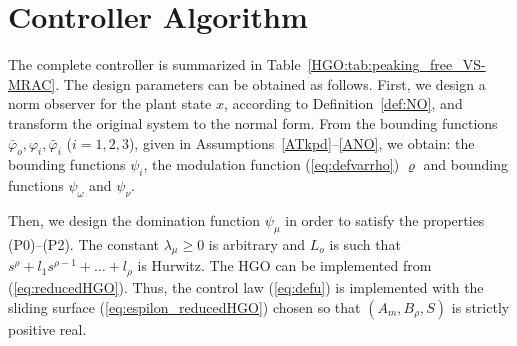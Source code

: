 \documentclass{rncauth}
\begin{document}
\section{Controller Algorithm\label{sec:controllerandSIMU}}

The complete controller is summarized in
Table~\ref{HGO:tab:peaking_free_VS-MRAC}. The design parameters can
be obtained as follows.
%
First, we design a norm observer for the plant state $x$,
according to Definition~\ref{def:NO}, and transform the original
system to the normal form. From the bounding functions
$\bar{\varphi}_o, \varphi_i, \bar{\varphi}_i$ ($i=1,2,3$), given
in Assumptions~\ref{ATkpd}--\ref{ANO}, we obtain: the bounding
functions $\psi_i$, the modulation function (\ref{eq:defvarrho})
$\varrho$ and bounding functions $\psi_\omega$ and $\psi_\nu$.

Then, we design the domination function $\psi_\mu$ in order to
satisfy the properties (P0)--(P2). The constant
$\lambda_\mu\!\geq\!0$ is arbitrary and $L_o$ is such that
$s^{\rho}\!+\!l_1 s^{\rho-1}\!+\!\ldots\!+\!l_{\rho}$ is Hurwitz.
The HGO can be implemented from (\ref{eq:reducedHGO}). Thus, the
control law (\ref{eq:defu}) is implemented with the sliding
surface (\ref{eq:espilon_reducedHGO}) chosen so that
$(A_m,B_\rho,S)$ is strictly positive real.
\end{document}

